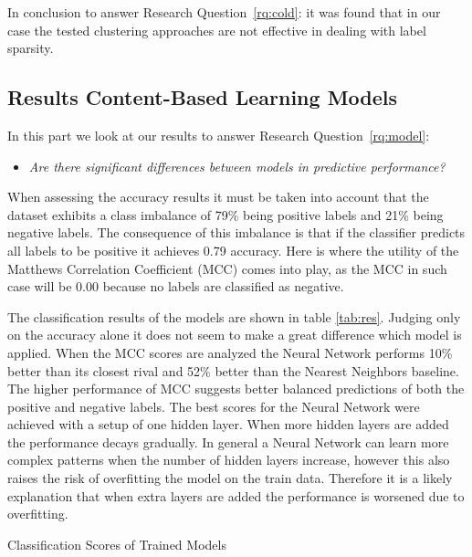 In conclusion to answer Research Question~\ref{rq:cold}: it was found that in our case the tested clustering approaches are not effective in dealing with label sparsity.

\subsection{Results Content-Based Learning Models}
\label{ssec:rcblm}

In this part we look at our results to answer Research Question~\ref{rq:model}:
\begin{itemize}
	\item[] \em Are there significant differences between models in predictive performance?
\end{itemize}

\noindent When assessing the accuracy results it must be taken into account that the dataset exhibits a class imbalance of 79\% being positive labels and 21\% being negative labels.
The consequence of this imbalance is that if the classifier predicts all labels to be positive it achieves 0.79 accuracy.
Here is where the utility of the Matthews Correlation Coefficient (MCC) comes into play, as the MCC in such case will be 0.00 because no labels are classified as negative.

The classification results of the models are shown in table \ref{tab:res}.
Judging only on the accuracy alone it does not seem to make a great difference which model is applied.
When the MCC scores are analyzed the Neural Network performs 10\% better than its closest rival and 52\% better than the Nearest Neighbors baseline.
The higher performance of MCC suggests better balanced predictions of both the positive and negative labels.
The best scores for the Neural Network were achieved with a setup of one hidden layer.
When more hidden layers are added the performance decays gradually.
In general a Neural Network can learn more complex patterns when the number of hidden layers increase, however this also raises the risk of overfitting the model on the train data.
Therefore it is a likely explanation that when extra layers are added the performance is worsened due to overfitting.

\begin{table}[h]
\begin{footnotesize}

\end{footnotesize}
\caption{\label{tab:res} \footnotesize{Classification Scores of Trained Models}}
\end{table}

